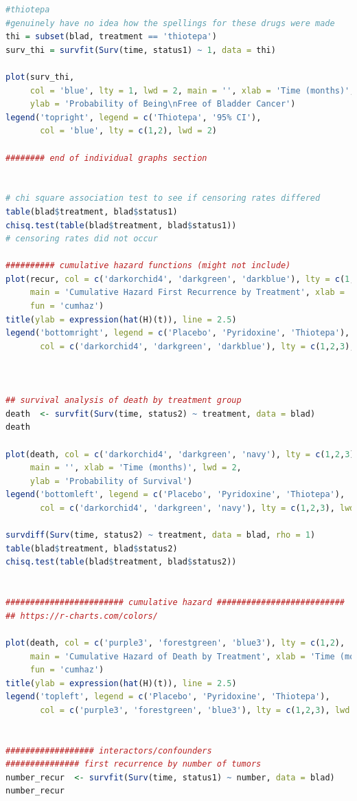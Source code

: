 \documentclass{article}
\begin{document}
\begin{lstlisting}[language=R,caption={Case 1: Bladder Cancer Survival Analysis},label={lst:case1}]
#thiotepa
#genuinely have no idea how the spellings for these drugs were made
thi = subset(blad, treatment == 'thiotepa')
surv_thi = survfit(Surv(time, status1) ~ 1, data = thi)

plot(surv_thi, 
     col = 'blue', lty = 1, lwd = 2, main = '', xlab = 'Time (months)', 
     ylab = 'Probability of Being\nFree of Bladder Cancer')
legend('topright', legend = c('Thiotepa', '95% CI'),
       col = 'blue', lty = c(1,2), lwd = 2)

######## end of individual graphs section


# chi square association test to see if censoring rates differed
table(blad$treatment, blad$status1)
chisq.test(table(blad$treatment, blad$status1))
# censoring rates did not occur

########## cumulative hazard functions (might not include)
plot(recur, col = c('darkorchid4', 'darkgreen', 'darkblue'), lty = c(1,2,3), 
     main = 'Cumulative Hazard First Recurrence by Treatment', xlab = 't', lwd = 2,
     fun = 'cumhaz')
title(ylab = expression(hat(H)(t)), line = 2.5)
legend('bottomright', legend = c('Placebo', 'Pyridoxine', 'Thiotepa'), 
       col = c('darkorchid4', 'darkgreen', 'darkblue'), lty = c(1,2,3), lwd = 2)



## survival analysis of death by treatment group
death  <- survfit(Surv(time, status2) ~ treatment, data = blad)
death

plot(death, col = c('darkorchid4', 'darkgreen', 'navy'), lty = c(1,2,3), 
     main = '', xlab = 'Time (months)', lwd = 2,
     ylab = 'Probability of Survival')
legend('bottomleft', legend = c('Placebo', 'Pyridoxine', 'Thiotepa'), 
       col = c('darkorchid4', 'darkgreen', 'navy'), lty = c(1,2,3), lwd = 2)

survdiff(Surv(time, status2) ~ treatment, data = blad, rho = 1) 
table(blad$treatment, blad$status2)
chisq.test(table(blad$treatment, blad$status2))


######################## cumulative hazard ##########################
## https://r-charts.com/colors/

plot(death, col = c('purple3', 'forestgreen', 'blue3'), lty = c(1,2), 
     main = 'Cumulative Hazard of Death by Treatment', xlab = 'Time (months)', lwd = 2,
     fun = 'cumhaz')
title(ylab = expression(hat(H)(t)), line = 2.5)
legend('topleft', legend = c('Placebo', 'Pyridoxine', 'Thiotepa'), 
       col = c('purple3', 'forestgreen', 'blue3'), lty = c(1,2,3), lwd = 2)


################## interactors/confounders
############### first recurrence by number of tumors
number_recur  <- survfit(Surv(time, status1) ~ number, data = blad)
number_recur



\end{lstlisting}
\end{document}
